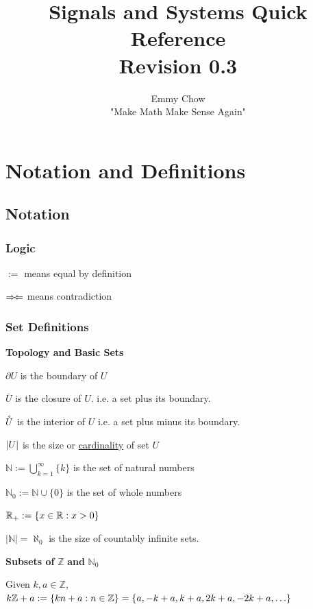 \documentclass[11pt]{article}
\title{Signals and Systems Quick Reference \\ Revision 0.3}
\author{Emmy Chow \\ "Make Math Make Sense Again"}
\date{}
\begin{document}
  \maketitle
  \tableofcontents

  \pagebreak

  \section{Notation and Definitions}

  \subsection{Notation}

  \subsubsection{Logic}

  \(:= \) means equal by definition

  \(\Rightarrow\!\Leftarrow\) means contradiction
  \subsubsection{Set Definitions}

  \textbf{Topology and Basic Sets}

  \(\partial U\) is the boundary of \(U\)

  \(\overbar{U}\) is the closure of \(U\). i.e. a set plus its boundary.

  \(\mathring{U}\) is the interior of \(U\) i.e. a set plus minus its boundary.

  \(\left|U\right|\) is the size or \href{https://brilliant.org/wiki/cardinality/}{cardinality} of set \(U\)

  \(\mathbb{N} := \displaystyle \bigcup_{k = 1}^{\infty} \{k\}\) is the set of natural numbers

  \(\mathbb{N}_0 := \mathbb{N} \cup \{0\}\) is the set of whole numbers

  \(\mathbb{R}_{+} := {\left\{ x \in \mathbb{R} : x > 0 \right\}}\)

  \(|\mathbb{N}| = \aleph_0\) is the size of countably infinite sets.

  \textbf{Subsets of} \(\mathbb{Z}\) \textbf{and} \(\mathbb{N}_0\)

  Given \(k, a \in \mathbb{Z}\),
  \(k\mathbb{Z} + a:= \brc{kn + a : n \in \mathbb{Z}} = \brc{a, -k + a, k + a, 2k + a, -2k + a, \dots}\)
\end{document}
